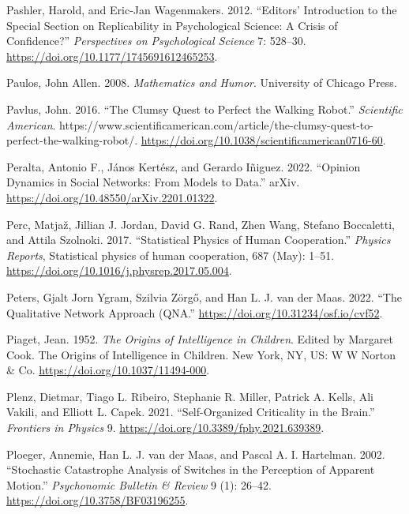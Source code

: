 \documentclass[
  a4paper,
  DIV=11,
  numbers=noendperiod,
  oneside]{scrreprt}
\newlength{\cslhangindent}
\newenvironment{CSLReferences}[2] %
 {\begin{list}{}{%
  \setlength{\itemindent}{0pt}
  \setlength{\leftmargin}{0pt}
  \setlength{\parsep}{0pt}
  \ifodd #1
   \setlength{\leftmargin}{\cslhangindent}
   \setlength{\itemindent}{-1\cslhangindent}
  \fi
  \setlength{\itemsep}{#2\baselineskip}}}
 {\end{list}}
\begin{document}
\begin{CSLReferences}{1}{0}
Pashler, Harold, and Eric-Jan Wagenmakers. 2012. {``Editors'
Introduction to the Special Section on Replicability in Psychological
Science: {A} Crisis of Confidence?''} \emph{Perspectives on
Psychological Science} 7: 528--30.
\url{https://doi.org/10.1177/1745691612465253}.

Paulos, John Allen. 2008. \emph{Mathematics and {Humor}}. {University of
Chicago Press}.

Pavlus, John. 2016. {``The {Clumsy Quest} to {Perfect} the {Walking
Robot}.''} \emph{Scientific American}.
https://www.scientificamerican.com/article/the-clumsy-quest-to-perfect-the-walking-robot/.
\url{https://doi.org/10.1038/scientificamerican0716-60}.

Peralta, Antonio F., János Kertész, and Gerardo Iñiguez. 2022.
{``Opinion Dynamics in Social Networks: {From} Models to Data.''}
{arXiv}. \url{https://doi.org/10.48550/arXiv.2201.01322}.

Perc, Matjaž, Jillian J. Jordan, David G. Rand, Zhen Wang, Stefano
Boccaletti, and Attila Szolnoki. 2017. {``Statistical Physics of Human
Cooperation.''} \emph{Physics Reports}, Statistical physics of human
cooperation, 687 (May): 1--51.
\url{https://doi.org/10.1016/j.physrep.2017.05.004}.

Peters, Gjalt Jorn Ygram, Szilvia Zörgő, and Han L. J. van der Maas.
2022. {``The {Qualitative Network Approach} ({QNA}.''}
\url{https://doi.org/10.31234/osf.io/cvf52}.

Piaget, Jean. 1952. \emph{The Origins of Intelligence in Children}.
Edited by Margaret Cook. The Origins of Intelligence in Children. {New
York, NY, US}: {W W Norton \& Co}.
\url{https://doi.org/10.1037/11494-000}.

Plenz, Dietmar, Tiago L. Ribeiro, Stephanie R. Miller, Patrick A. Kells,
Ali Vakili, and Elliott L. Capek. 2021. {``Self-{Organized Criticality}
in the {Brain}.''} \emph{Frontiers in Physics} 9.
\url{https://doi.org/10.3389/fphy.2021.639389}.

Ploeger, Annemie, Han L. J. van der Maas, and Pascal A. I. Hartelman.
2002. {``Stochastic Catastrophe Analysis of Switches in the Perception
of Apparent Motion.''} \emph{Psychonomic Bulletin \& Review} 9 (1):
26--42. \url{https://doi.org/10.3758/BF03196255}.


\end{CSLReferences}
\end{document}
